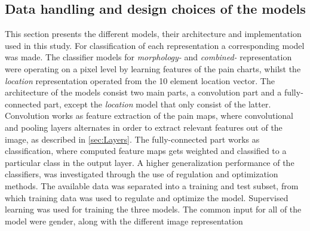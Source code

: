 \subsection{Data handling and design choices of the models}
This section presents the different models, their architecture and implementation used in this study.
For classification of each representation a corresponding model was made. The classifier models for \textit{morphology-} and \textit{combined-} representation were operating on a pixel level by learning features of the pain charts, whilst the \textit{location} representation operated from the 10 element location vector. 
The architecture of the models consist two main parts, a convolution part and a fully-connected part, except the \textit{location} model that only consist of the latter.   
Convolution works as feature extraction of the pain maps, where convolutional and pooling layers alternates in order to extract relevant features out of the image, as described in \autoref{sec:Layers}.
The fully-connected part works as classification, where computed feature maps gets weighted and classified to a particular class in the output layer. 
A higher generalization performance of the classifiers, was investigated through the use of regulation and optimization methods.
The available data was separated into a training and test subset, from which training data was used to regulate and optimize the model. 
Supervised learning was used for training the three models. The common input for all of the model were gender, along with the different image representation



